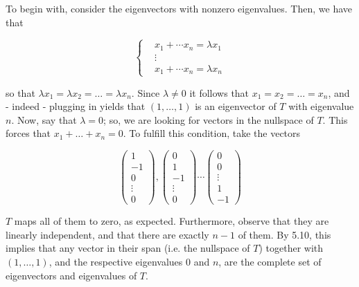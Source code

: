 \documentclass{book}
\begin{document}
\begin{enumerate}
To begin with, consider the eigenvectors with nonzero eigenvalues.  Then, we have that

\begin{equation*}
    \begin{cases}
        & x_1 + \cdots x_n = \lambda x_1 \\
        & \vdots \\
        & x_1 + \cdots x_n = \lambda x_n
    \end{cases}
\end{equation*}

so that \(\lambda x_1 = \lambda x_2 = \dots = \lambda x_n\).  Since \(\lambda \neq 0\) it follows that \(x_1 = x_2 = \dots = x_n\), and - indeed - plugging in yields that \((1,\dots,1)\) is an eigenvector of \(T\) with eigenvalue \(n\).  Now, say that \(\lambda = 0\); so, we are looking for vectors in the nullspace of \(T\).  This forces that \(x_1 + \dots + x_n = 0\).  To fulfill this condition, take the vectors

\begin{equation*}
    \begin{pmatrix}
        1 \\
        -1 \\
        0 \\
        \vdots \\
        0
    \end{pmatrix},
    \begin{pmatrix}
        0 \\
        1 \\
        -1 \\
        \vdots \\
        0
    \end{pmatrix}
    \cdots
    \begin{pmatrix}
        0 \\
        0 \\
        \vdots \\
        1 \\
        -1
    \end{pmatrix}
\end{equation*}

\(T\) maps all of them to zero, as expected.  Furthermore, observe that they are linearly independent, and that there are exactly \(n-1\) of them.  By 5.10, this implies that any vector in their span (i.e. the nullspace of \(T\)) together with \((1,\dots,1)\), and the respective eigenvalues \(0\) and \(n\), are the complete set of eigenvectors and eigenvalues of \(T\).


\end{enumerate}
\end{document}
